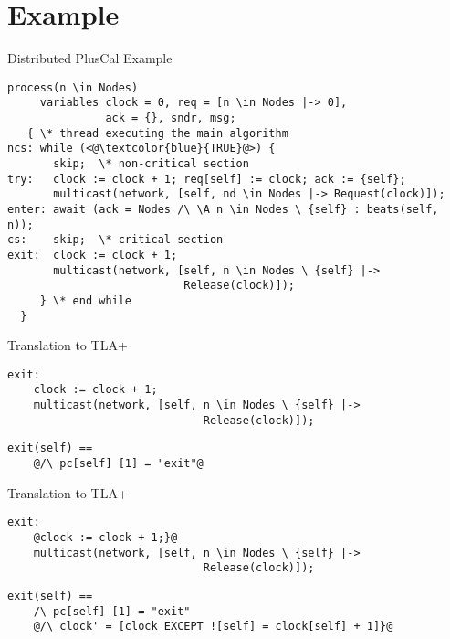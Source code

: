 \documentclass{beamer}
\begin{document}
\section{Example}
\begin{frame}[fragile]{Distributed PlusCal Example}
 \begin{lstlisting}[language=pluscal, frame = tlrb, numbers=none]  
 process(n \in Nodes)
     variables clock = 0, req = [n \in Nodes |-> 0],
               ack = {}, sndr, msg;
   { \* thread executing the main algorithm
ncs: while (<@\textcolor{blue}{TRUE}@>) {
       skip;  \* non-critical section
try:   clock := clock + 1; req[self] := clock; ack := {self};
       multicast(network, [self, nd \in Nodes |-> Request(clock)]);
enter: await (ack = Nodes /\ \A n \in Nodes \ {self} : beats(self, n));
cs:    skip;  \* critical section
exit:  clock := clock + 1;
       multicast(network, [self, n \in Nodes \ {self} |->
                           Release(clock)]);
     } \* end while
  } 
\end{lstlisting}
\end{frame}

\begin{frame}[fragile]{Translation to TLA+}
 \begin{lstlisting}[language=pluscal, frame = tlrb, numbers=none]  
 exit:  
    clock := clock + 1;
    multicast(network, [self, n \in Nodes \ {self} |->
                              Release(clock)]);
\end{lstlisting}


\begin{lstlisting}[language=pluscal, frame = tlrb, numbers=none]  
exit(self) == 
    @/\ pc[self] [1] = "exit"@
\end{lstlisting}
\end{frame}

\begin{frame}[fragile]{Translation to TLA+}
 \begin{lstlisting}[language=pluscal, frame = tlrb, numbers=none]  
 exit:  
    @clock := clock + 1;}@
    multicast(network, [self, n \in Nodes \ {self} |->
                              Release(clock)]);
\end{lstlisting}


\begin{lstlisting}[language=pluscal, frame = tlrb, numbers=none]  
exit(self) == 
    /\ pc[self] [1] = "exit"
    @/\ clock' = [clock EXCEPT ![self] = clock[self] + 1]}@
\end{lstlisting}
\end{frame}
\end{document}
